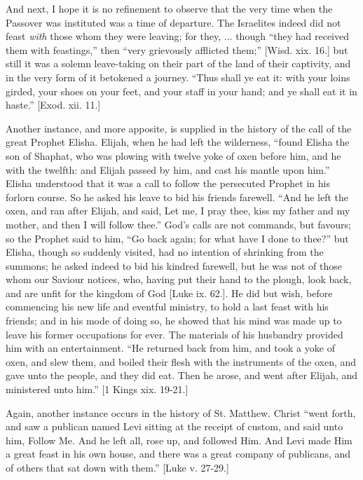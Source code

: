 And next, I hope it is no refinement to observe that the very time
when the Passover was instituted was a time of departure. The
Israelites indeed did not feast \emph{with} those whom they were
leaving; for they, ... though ``they had received them with
feastings,'' then ``very grievously afflicted them;'' [Wisd.
xix. 16.] but still it was a solemn leave-taking on their part of the
land of their captivity, and in the very form of it betokened a
journey. ``Thus shall ye eat it: with your loins girded, your
shoes on your feet, and your staff in your hand; and ye shall eat it
in haste.'' [Exod. xii. 11.]

Another instance, and more apposite, is supplied in the history of
the call of the great Prophet Elisha. Elijah, when he had left the
wilderness, ``found Elisha the son of Shaphat, who was plowing
with twelve yoke of oxen before him, and he with the twelfth: and
Elijah passed by him, and cast his mantle upon him.'' Elisha
understood that it was a call to follow the persecuted Prophet in his
forlorn course. So he asked his leave to bid his friends farewell.
``And he left the oxen, and ran after Elijah, and said, Let me, I
pray thee, kiss my father and my mother, and then I will follow
thee.'' God's calls are not commands, but favours; so the Prophet
said to him, ``Go back again; for what have I done to thee?''
but Elisha, though so suddenly visited, had no intention of shrinking
from the summons; he asked indeed to bid his kindred farewell, but he
was not of those whom our Saviour notices, who, having put their hand
to the plough, look back, and are unfit for the kingdom of God [Luke
ix. 62.]. He did but wish, before commencing his new life and eventful
ministry, to hold a last feast with his friends; and in his mode of
doing so, he showed that his mind was made up to leave his former
occupations for ever. The materials of his husbandry provided him with
an entertainment. ``He returned back from him, and took a yoke of
oxen, and slew them, and boiled their flesh with the instruments of
the oxen, and gave unto the people, and they did eat. Then he arose,
and went after Elijah, and ministered unto him.'' [1 Kings xix.
19-21.]

Again, another instance occurs in the history of St. Matthew.
Christ ``went forth, and saw a publican named Levi sitting at the
receipt of custom, and said unto him, Follow Me. And he left all, rose
up, and followed Him. And Levi made Him a great feast in his own
house, and there was a great company of publicans, and of others that
sat down with them.'' [Luke v. 27-29.]

